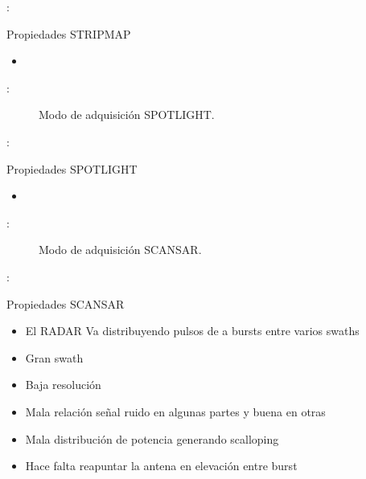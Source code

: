 \begin{frame}{\secname : \subsecname}
    \begin{block}{Propiedades STRIPMAP}
      \begin{itemize}
        \item
      \end{itemize}
    \end{block}
\end{frame}
\begin{frame}{\secname : \subsecname}
  \begin{figure}
    \centering
    \caption{Modo de adquisición SPOTLIGHT.}
    \label{}
  \end{figure}
\end{frame}

\begin{frame}{\secname : \subsecname}
    \begin{block}{Propiedades SPOTLIGHT}
      \begin{itemize}
        \item
      \end{itemize}
    \end{block}
\end{frame}

\begin{frame}{\secname : \subsecname}
  \begin{figure}
    \centering
    \caption{Modo de adquisición SCANSAR.}
    \label{}
  \end{figure}
\end{frame}

\begin{frame}{\secname : \subsecname}
    \begin{block}{Propiedades SCANSAR}
      \begin{itemize}
        \item El RADAR Va distribuyendo pulsos de  a bursts entre varios swaths
        \item Gran swath
        \item Baja resolución
        \item Mala relación señal ruido en algunas partes y buena en otras
        \item Mala distribución de potencia generando scalloping
        \item Hace falta reapuntar la antena en elevación entre burst
      \end{itemize}
    \end{block}
\end{frame}

